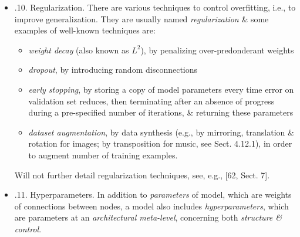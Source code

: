 \documentclass{article}
\begin{document}
\begin{itemize}
\begin{itemize}
\begin{itemize}
			In order to be able to estimate potential for generalization, dataset is actually divided into 2 portions, with a ratio of $\approx70/30$:
			\begin{itemize}
				\item {\it training set} -- which will be used for training neural network
				\item {\it validation set}, also named {\it test set}\footnote{Actually, a difference could (should) be made, as explained by Hastie et al. in [72, p. 222]: ``It is important to note: there are in fact 2 separate goals that might have in mid:
					\begin{enumerate}
						\item Model selection: estimating performance of different models in order to choose best one.
						\item Model assessment: having chosen a final model, estimating its prediction error (generalization error) on new data.
					\end{enumerate}
					If we are in a data-rich situation, best approach for both problems is to randomly divided dataset into 3 parts: a training set, a validation set, \& a test set. Training set is used to fit models; validation set is used to estimate prediction error for model selection; test set is used for assessment of generalization error of final chosen model.'' However, as a matter of simplification, will not consider that difference in book.} -- which will be used to estimate capacity of model for generalization.
			\end{itemize}
			\item {.10. Regularization.} There are various techniques to control overfitting, i.e., to improve generalization. They are usually named {\it regularization} \& some examples of well-known techniques are:
			\begin{itemize}
				\item {\it weight decay} (also known as $L^2$), by penalizing over-predonderant weights
				\item {\it dropout}, by introducing random disconnections
				\item {\it early stopping}, by storing a copy of model parameters every time error on validation set reduces, then terminating after an absence of progress during a pre-specified number of iterations, \& returning these parameters
				\item {\it dataset augmentation}, by data synthesis (e.g., by mirroring, translation \& rotation for images; by transposition for music, see Sect. 4.12.1), in order to augment number of training examples.
			\end{itemize}
			Will not further detail regularization techniques, see, e.g., [62, Sect. 7].
			\item {.11. Hyperparameters.} In addition to {\it parameters} of model, which are weights of connections between nodes, a model also includes {\it hyperparameters}, which are parameters at an {\it architectural meta-level}, concerning both {\it structure \& control}.
			

\end{itemize}
\end{itemize}
\end{itemize}
\end{document}
